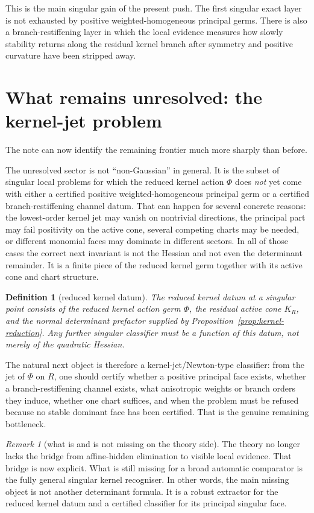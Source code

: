 \documentclass[11pt,a4paper]{article}
\numberwithin{equation}{section}
\theoremstyle{thmcompact}
\newtheorem{definition}[theorem]{Definition}
\theoremstyle{remark}
\newtheorem*{remarkplain}{Remark}
\newenvironment{remark}[1][]%
{\begin{remarkbox}\begin{remarkplain}[#1]\normalfont}
{\end{remarkplain}\end{remarkbox}}
\begin{document}
This is the main singular gain of the present push. The first singular exact layer is not exhausted by positive weighted-homogeneous principal germs. There is also a branch-restiffening layer in which the local evidence measures how slowly stability returns along the residual kernel branch after symmetry and positive curvature have been stripped away.

\section{What remains unresolved: the kernel-jet problem}

The note can now identify the remaining frontier much more sharply than before.

The unresolved sector is not ``non-Gaussian'' in general. It is the subset of singular local problems for which the reduced kernel action $\Phi$ does \emph{not} yet come with either a certified positive weighted-homogeneous principal germ or a certified branch-restiffening channel datum. That can happen for several concrete reasons: the lowest-order kernel jet may vanish on nontrivial directions, the principal part may fail positivity on the active cone, several competing charts may be needed, or different monomial faces may dominate in different sectors. In all of those cases the correct next invariant is not the Hessian and not even the determinant remainder. It is a finite piece of the reduced kernel germ together with its active cone and chart structure.

\begin{definition}[reduced kernel datum]
The \emph{reduced kernel datum} at a singular point consists of the reduced kernel action germ $\Phi$, the residual active cone $K_R$, and the normal determinant prefactor supplied by Proposition~\ref{prop:kernel-reduction}. Any further singular classifier must be a function of this datum, not merely of the quadratic Hessian.
\end{definition}

The natural next object is therefore a kernel-jet/Newton-type classifier: from the jet of $\Phi$ on $R$, one should certify whether a positive principal face exists, whether a branch-restiffening channel exists, what anisotropic weights or branch orders they induce, whether one chart suffices, and when the problem must be refused because no stable dominant face has been certified. That is the genuine remaining bottleneck.

\begin{remark}[what is and is not missing on the theory side]
The theory no longer lacks the bridge from affine-hidden elimination to visible local evidence. That bridge is now explicit. What is still missing for a broad automatic comparator is the fully general singular kernel recogniser. In other words, the main missing object is not another determinant formula. It is a robust extractor for the reduced kernel datum and a certified classifier for its principal singular face.
\end{remark}
\end{document}
